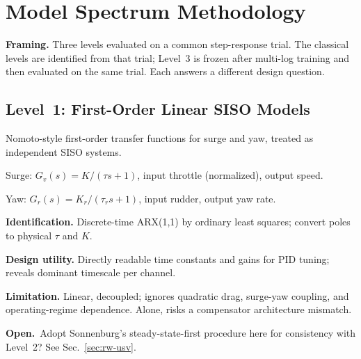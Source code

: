 \documentclass[11pt]{article}
\newcommand{\Open}{\textbf{Open.}\ }
\begin{document}
\section{Model Spectrum Methodology}
\label{sec:methodology}

\begin{outline}
\item \textbf{Framing.} Three levels evaluated on a common step-response trial. The
  classical levels are identified from that trial; Level~3 is frozen after multi-log
  training and then evaluated on the same trial. Each answers a different design
  question.
\end{outline}

\subsection{Level~1: First-Order Linear SISO Models}
\label{sec:l1}
\begin{outline}
\item Nomoto-style first-order transfer functions for surge and yaw, treated as
  independent SISO systems.
  \begin{outline}
  \item Surge: $G_v(s) = K/(\tau s + 1)$, input throttle (normalized), output speed.
  \item Yaw: $G_r(s) = K_r/(\tau_r s + 1)$, input rudder, output yaw rate.
  \end{outline}
\item \textbf{Identification.} Discrete-time ARX(1,1) by ordinary least squares;
  convert poles to physical $\tau$ and $K$.
\item \textbf{Design utility.} Directly readable time constants and gains for PID
  tuning; reveals dominant timescale per channel.
\item \textbf{Limitation.} Linear, decoupled; ignores quadratic drag, surge-yaw
  coupling, and operating-regime dependence. Alone, risks a compensator
  architecture mismatch.
\item \Open Adopt Sonnenburg's steady-state-first procedure here for consistency
  with Level~2? See Sec.~\ref{sec:rw-usv}.
\end{outline}
\end{document}
